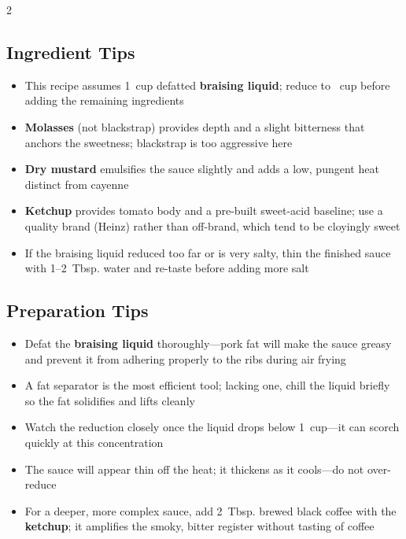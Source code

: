 \documentclass[11pt,letterpaper]{article}
\begin{document}
{\begin{multicols}{2}
\subsection*{Ingredient Tips}
\begin{itemize}
    \item This recipe assumes 1~cup defatted \textbf{braising liquid}; reduce to ~cup before adding the remaining ingredients
    \item \textbf{Molasses} (not blackstrap) provides depth and a slight bitterness that anchors the sweetness; blackstrap is too aggressive here
    \item \textbf{Dry mustard} emulsifies the sauce slightly and adds a low, pungent heat distinct from cayenne
    \item \textbf{Ketchup} provides tomato body and a pre-built sweet-acid baseline; use a quality brand (Heinz) rather than off-brand, which tend to be cloyingly sweet
    \item If the braising liquid reduced too far or is very salty, thin the finished sauce with 1--2~Tbsp. water and re-taste before adding more salt
\end{itemize}

\subsection*{Preparation Tips}
\begin{itemize}
    \item Defat the \textbf{braising liquid} thoroughly---pork fat will make the sauce greasy and prevent it from adhering properly to the ribs during air frying
    \item A fat separator is the most efficient tool; lacking one, chill the liquid briefly so the fat solidifies and lifts cleanly
    \item Watch the reduction closely once the liquid drops below 1~cup---it can scorch quickly at this concentration
    \item The sauce will appear thin off the heat; it thickens as it cools---do not over-reduce
    \item For a deeper, more complex sauce, add 2~Tbsp. brewed black coffee with the \textbf{ketchup}; it amplifies the smoky, bitter register without tasting of coffee
\end{itemize}


\end{multicols}}
\end{document}
